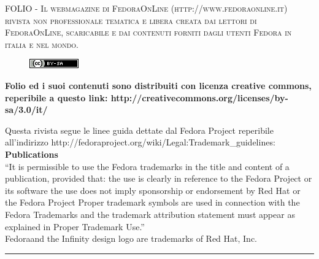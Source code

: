 \onecolumn
\thispagestyle{empty}
\vspace*{6,5cm}
\color[cmyk]{0, 0, 0, 0}
\centering
\textsc{\LARGE FOLIO - Il webmagazine di FedoraOnLine (http://www.fedoraonline.it)}\\[1.0cm]
\textsc{\Large rivista non professionale tematica e libera creata dai lettori di FedoraOnLine, scaricabile e dai contenuti forniti dagli utenti Fedora in italia e nel mondo.}\\[0.5cm]
\begin{figure}[htbp]
\centering
\includegraphics[scale=1.0]{immagini/logo/cc.png}
\end{figure}
{\bfseries Folio ed i suoi contenuti sono distribuiti con licenza creative commons, reperibile a questo link: http://creativecommons.org/licenses/by-sa/3.0/it/ }\\[0.4cm]
{\doublespacing}
\begin{tiny}
\begin{spacing}{1.0}
Questa rivista segue le linee guida dettate dal Fedora Project reperibile all'indirizzo  http://fedoraproject.org/wiki/Legal:Trademark\_guidelines:\\
{\bfseries Publications}\\
``It is permissible to use the Fedora trademarks in the title and content of a publication, provided that:
    the use is clearly in reference to the Fedora Project or its software
    the use does not imply sponsorship or endorsement by Red Hat or the Fedora Project
    Proper trademark symbols are used in connection with the Fedora Trademarks and the trademark attribution statement must appear as explained in Proper Trademark Use.'' \\
Fedora\textregistered and the Infinity design logo are trademarks of Red Hat, Inc.
\end{spacing}
\end{tiny}
\rule{\textwidth}{0.5mm}\\
\vfill
\noindent

